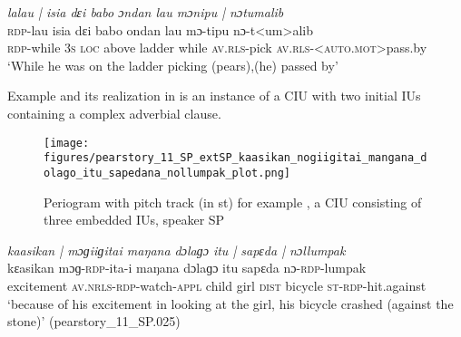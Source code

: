 \largerpage
\ea
\label{ex:tooka_monipu_laalau_isia_dei_babo_ondan}
\textit{lalau | isia dɛi babo ɔndan lau mɔnipu | nɔtumalib } \\
\gll \textsc{rdp}-lau isia dɛi babo ondan lau mɔ-tipu nɔ-t<um>alib \\
\textsc{rdp}-while 3\textsc{s} \textsc{loc} above ladder while \textsc{av.rls-}pick 	\textsc{av.rls}-\textsc{<auto.mot>}pass.by\\
\glt ‘While he was on the ladder picking (pears),(he) passed by’
\zlast\clearpage


Example  and its realization in  is an instance of a CIU with two initial IUs containing a complex adverbial clause.  



\begin{figure}	\texttt{[image: figures/pearstory\_11\_SP\_extSP\_kaasikan\_nogiigitai\_mangana\_dolago\_itu\_sapedana\_nollumpak\_plot.png]}
	\caption{Periogram with pitch track (in st) for example , a CIU consisting of three embedded IUs, speaker SP}
	\label{pitch:kaasikan nogiigitai mangana dolago itu sapedana nollumpak2}
\end{figure}



\ea
\label{ex:kaasikan nogiigitai mangana dolago itu sapedana nollumpak2}
\textit{kaasikan | mɔɡiiɡitai maŋana dɔlaɡɔ itu | sapɛda | nɔllumpak} \\
\gll kɛasikan mɔɡ-\textsc{rdp}-ita-i maŋana dɔlaɡɔ itu sapɛda nɔ-\textsc{rdp}-lumpak \\
excitement \textsc{av.nrls}-\textsc{rdp}-watch-\textsc{appl} child girl \textsc{dist} bicycle \textsc{st}-\textsc{rdp}-hit.against\\
\glt ‘because of his excitement in looking at the girl, his bicycle crashed (against the stone)’ \hfill(pearstory\_11\_SP.025)
\z




